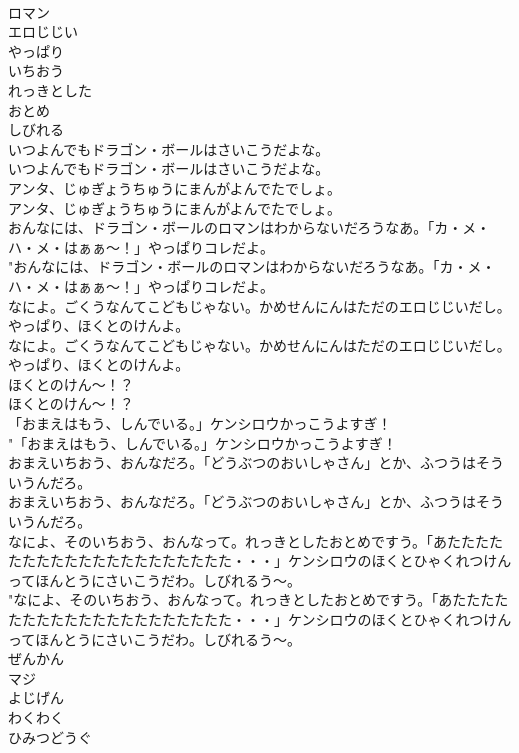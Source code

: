 \documentclass[8pt]{extreport}
\begin{document}
\begin{CJK}{UTF8}{min}
\\	ロマン
\\	エロじじい
\\	やっぱり
\\	いちおう
\\	れっきとした
\\	おとめ
\\	しびれる
\\	いつよんでもドラゴン・ボールはさいこうだよな。	
\\	いつよんでもドラゴン・ボールはさいこうだよな。 
\\	アンタ、じゅぎょうちゅうにまんがよんでたでしょ。	
\\	アンタ、じゅぎょうちゅうにまんがよんでたでしょ。 
\\	おんなには、ドラゴン・ボールのロマンはわからないだろうなあ。「カ・メ・ハ・メ・はぁぁ～！」やっぱりコレだよ。	
\\	"おんなには、ドラゴン・ボールのロマンはわからないだろうなあ。「カ・メ・ハ・メ・はぁぁ～！」やっぱりコレだよ。 
\\	なによ。ごくうなんてこどもじゃない。かめせんにんはただのエロじじいだし。やっぱり、ほくとのけんよ。	
\\	なによ。ごくうなんてこどもじゃない。かめせんにんはただのエロじじいだし。やっぱり、ほくとのけんよ。 
\\	ほくとのけん～！？	
\\	ほくとのけん～！？ 
\\	「おまえはもう、しんでいる。」ケンシロウかっこうよすぎ！	
\\	"「おまえはもう、しんでいる。」ケンシロウかっこうよすぎ！ 
\\	おまえいちおう、おんなだろ。「どうぶつのおいしゃさん」とか、ふつうはそういうんだろ。	
\\	おまえいちおう、おんなだろ。「どうぶつのおいしゃさん」とか、ふつうはそういうんだろ。 
\\	なによ、そのいちおう、おんなって。れっきとしたおとめですう。「あたたたたたたたたたたたたたたたたたたたた・・・」ケンシロウのほくとひゃくれつけんってほんとうにさいこうだわ。しびれるう～。	
\\	"なによ、そのいちおう、おんなって。れっきとしたおとめですう。「あたたたたたたたたたたたたたたたたたたたた・・・」ケンシロウのほくとひゃくれつけんってほんとうにさいこうだわ。しびれるう～。 
\\	ぜんかん
\\	マジ
\\	よじげん
\\	わくわく
\\	ひみつどうぐ

\end{CJK}
\end{document}

